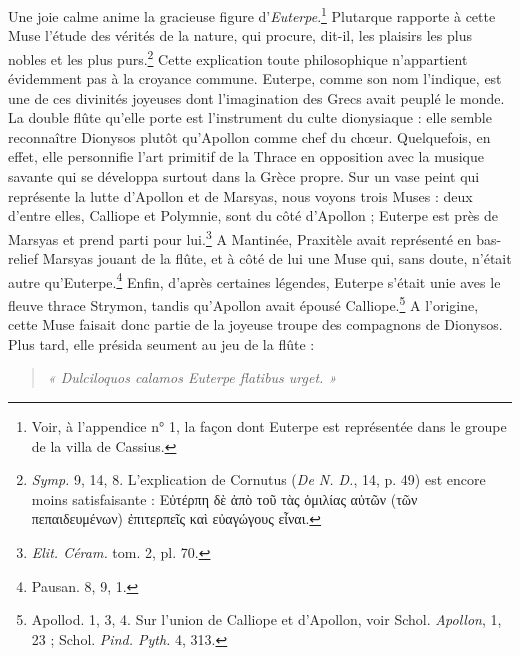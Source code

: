 \documentclass[landscape, a4paper, 11pt, oneside, polutonikogreek, french]{article}
\begin{document}
Une joie calme anime la gracieuse figure d'\emph{Euterpe}.\footnote{Voir, à l'appendice n° 1, la façon dont Euterpe est représentée dans le groupe de la villa de Cassius.} Plutarque rapporte à cette Muse l'étude des vérités de la nature, qui procure, dit-il, les plaisirs les plus nobles et les plus purs.\footnote{\emph{Symp.} 9, 14, 8. L'explication de Cornutus (\emph{De N. D.}, 14, p. 49) est encore moins satisfaisante : Εὐτέρπη δὲ ἀπὸ τοῦ τὰς ὁμιλίας αὐτῶν (τῶν πεπαιδευμένων) ἐπιτερπεῖς καὶ εὐαγώγους εἶναι.} Cette explication toute philosophique n'appartient évidemment pas à la croyance commune. Euterpe, comme son nom l'indique, est une de ces divinités joyeuses dont l'imagination des Grecs avait peuplé le monde. La double flûte qu'elle porte est l'instrument du culte dionysiaque : elle semble reconnaître Dionysos plutôt qu'Apollon comme chef du chœur. Quelquefois, en effet, elle personnifie l'art primitif de la Thrace en opposition avec la musique savante qui se développa surtout dans la Grèce propre. Sur un vase peint qui représente la lutte d'Apollon et de Marsyas, nous voyons trois Muses : deux d'entre elles, Calliope et Polymnie, sont du côté d'Apollon ; Euterpe est près de Marsyas et prend parti pour lui.\footnote{\emph{Elit. Céram.} tom. 2, pl. 70.} A Mantinée, Praxitèle avait représenté en bas-relief Marsyas jouant de la flûte, et à côté de lui une Muse qui, sans doute, n'était autre qu'Euterpe.\footnote{Pausan. 8, 9, 1.} Enfin, d'après certaines légendes, Euterpe s'était unie aves le fleuve thrace Strymon, tandis qu'Apollon avait épousé Calliope.\footnote{Apollod. 1, 3, 4. Sur l'union de Calliope et d'Apollon, voir Schol. \emph{Apollon}, 1, 23 ; Schol. \emph{Pind. Pyth.} 4, 313.} A l'origine, cette Muse faisait donc partie de la joyeuse troupe des compagnons de Dionysos. Plus tard, elle présida seument au jeu de la flûte :
\begin{quotation}
\emph{« Dulciloquos calamos Euterpe flatibus urget. »}
\end{quotation}
\end{document}
